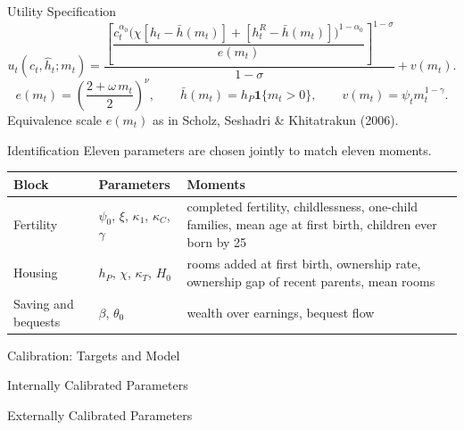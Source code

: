 \begin{frame}{Utility Specification}
\small
\[
u_t(c_t,\hat h_t;m_t)=
\frac{\left[\dfrac{c_t^{\alpha_0}\bigl(\chi[h_t-\bar h(m_t)]+[h^R_t-\bar h(m_t)]\bigr)^{1-\alpha_0}}{e(m_t)}\right]^{1-\sigma}}{1-\sigma}
+v(m_t).
\]
\[
e(m_t)=\left(\frac{2+\omega\, m_t}{2}\right)^{\nu},\qquad
\bar h(m_t)=h_P\mathbf{1}\{m_t>0\},\qquad
v(m_t)=\psi_t m_t^{1-\gamma}.
\]
\smallskip
Equivalence scale $e(m_t)$ as in Scholz, Seshadri \& Khitatrakun (2006).
\end{frame}


\begin{frame}{Identification}
\footnotesize
Eleven parameters are chosen jointly to match eleven moments.

\medskip
\renewcommand{\arraystretch}{1.25}
\begin{tabularx}{\textwidth}{@{}lp{}X@{}}
\toprule
Block & Parameters & Moments \\
\midrule
Fertility & $\psi_0$, $\xi$, $\kappa_1$, $\kappa_C$, $\gamma$ & completed fertility, childlessness, one-child families, mean age at first birth, children ever born by 25 \\
Housing & $h_P$, $\chi$, $\kappa_T$, $H_0$ & rooms added at first birth, ownership rate, ownership gap of recent parents, mean rooms \\
Saving and bequests & $\beta$, $\theta_0$ & wealth over earnings, bequest flow \\
\bottomrule
\end{tabularx}
\end{frame}

\begin{frame}{Calibration: Targets and Model}
\footnotesize
\linespread{1}\selectfont
\renewcommand{\arraystretch}{0.95}
\par
\smallskip
\end{frame}
\begin{frame}{Internally Calibrated Parameters}
\footnotesize

\renewcommand{\arraystretch}{1.12}

\end{frame}

\begin{frame}{Externally Calibrated Parameters}
\footnotesize
\renewcommand{\arraystretch}{1.0}

\end{frame}


